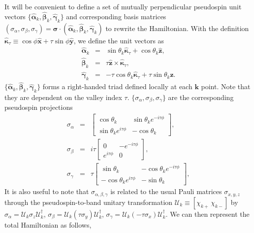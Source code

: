 \documentclass[reprint,amsmath,amssymb,aps,prb]{revtex4-1}
\begin{document}
It will be convenient to define \cite{Dimi1,Dimi2,tse2016coherent} a set of mutually perpendicular pseudospin unit vectors $\{\hat{\boldsymbol{\alpha}}_{k}, 
\hat{\boldsymbol{\beta}}_{k},
\hat{\boldsymbol{\gamma}}_{k}\}$ and corresponding basis matrices $(\sigma_\alpha,\sigma_\beta,\sigma_\gamma)=\bm{\sigma} \cdot (\hat{\bm{\alpha}}_k,\hat{\bm{\beta}}_k,\hat{\bm{\gamma}}_k)$ to rewrite the Hamiltonian. With the definition  
$\hat{\boldsymbol{\kappa}}_\tau \equiv \cos\phi\hat{\bm{x}}+\tau\sin\phi\hat{\bm{y}}$, we define the unit vectors as
%
\begin{eqnarray}
\hat{\boldsymbol{\alpha}}_{k} & = & \sin\theta_k \hat{\boldsymbol{\kappa}}_\tau+\cos\theta_k\hat{\bm{z}}, \\
\hat{\boldsymbol{\beta}}_{k} & = & \tau \hat{\bm{z}}\times\hat{\boldsymbol{\kappa}}_\tau, \\ 
\hat{\boldsymbol{\gamma}}_{k}& = & -\tau\cos\theta_k\hat{\boldsymbol{\kappa}}_\tau+\tau\sin\theta_k\hat{\bm{z}}. 
\end{eqnarray}
%
$\{\hat{\boldsymbol{\alpha}}_{k}, \hat{\boldsymbol{\beta}}_{k}, \hat{\boldsymbol{\gamma}}_{k}\}$ forms a right-handed triad defined locally at each $\bm{k}$ point. Note that they are dependent on the valley index $\tau$. $\{\sigma_\alpha,\sigma_\beta,\sigma_\gamma\}$ are the corresponding pseudospin projections
%
\begin{eqnarray}
\sigma_\alpha &=& \begin{bmatrix} \cos\theta_k & \sin\theta_k e^{-i\tau\phi} \\ \sin\theta_k e^{i\tau\phi} & -\cos\theta_k  \end{bmatrix}, \\
\sigma_\beta &=& i\tau \begin{bmatrix} 0 & -e^{-i\tau\phi} \\ e^{i\tau\phi} & 0  \end{bmatrix}, \\
\sigma_\gamma &=& \tau\begin{bmatrix} \sin\theta_k & -\cos\theta_k e^{-i\tau\phi} \\  -\cos\theta_k e^{i\tau\phi} & -\sin\theta_k \end{bmatrix},
\end{eqnarray}
%
 It is also useful to note that $\sigma_{\alpha,\beta,\gamma}$ is related to the usual Pauli matrices $\sigma_{x,y,z}$ through the pseudospin-to-band unitary transformation $\mathcal{U}_k \equiv [\chi_{k+}\, \chi_{k-}]$ by 
$\sigma_{\alpha} = \mathcal{U}_k\sigma_z\mathcal{U}^{\dagger}_k$, $\sigma_{\beta} = \mathcal{U}_k(\tau\sigma_y)\mathcal{U}^{\dagger}_k$, $\sigma_{\gamma} = \mathcal{U}_k(-\tau\sigma_x)\mathcal{U}^{\dagger}_k$. We can then represent the total Hamiltonian as follows, 
\end{document}
